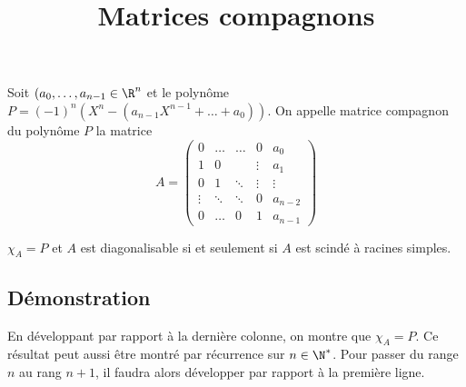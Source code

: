 \documentclass[fontsize=12pt,twoside=false,parskip=half, french]{scrartcl}
\title{Matrices compagnons}
\date{}
\author{}
\begin{document}
\maketitle
   Soit $(a_0, \ldots, a_{n - 1} \in \R^n$ et le polynôme $P = (-1)^n(X^n - (a_{n - 1}X^{n - 1} + \ldots + a_0))$.
   On appelle matrice compagnon du polynôme $P$ la matrice
   \[
      A = 
      \begin{pmatrix}
         0      & \ldots & \ldots & 0      & a_0\\
         1      & 0      &        & \vdots & a_1\\
         0      & 1      & \ddots & \vdots & \vdots\\
         \vdots & \ddots & \ddots & 0      & a_{n - 2}\\
         0      & \ldots & 0      & 1      & a_{n - 1}
      \end{pmatrix}
   \]
   \begin{Theoreme}
      $\chi_A = P$ et $A$ est diagonalisable si et seulement si $A$ est scindé à racines simples.
   \end{Theoreme}
   \subsection{Démonstration}
      En développant par rapport à la dernière colonne, on montre que $\chi_A = P$.
      Ce résultat peut aussi être montré par récurrence sur $n \in \N^*$. Pour passer du range $n$ au rang $n + 1$,
      il faudra alors développer par rapport à la première ligne.
      
\end{document}
